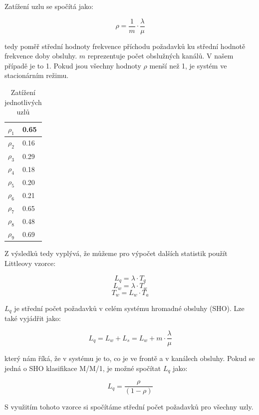 \documentclass{article}
\begin{document}
Zatížení uzlu se spočítá jako:

$$
	\rho = \frac{1}{m} \cdot \frac{\lambda}{\mu}
$$

tedy poměř střední hodnoty frekvence příchodu požadavků ku střední hodnotě frekvence doby obsluhy. $m$ reprezentuje počet obslužných kanálů. 
V našem případě je to 1.
Pokud jsou všechny hodnoty $ \rho $ menší než 1, je systém ve stacionárním režimu.

\begin{table} [ht!]
\centering
    \begin{tabular}{|l|l|}
    \hline
   $\rho_1$     & 0.65 \\ \hline
    $\rho_2$  & 0.16 \\ \hline
    $\rho_3$     & 0.29 \\ \hline
    $\rho_4$     & 0.18 \\ \hline
    $\rho_5$     & 0.20 \\ \hline
    $\rho_6$      & 0.21 \\ \hline
    $\rho_7$      & 0.65 \\ \hline
    $\rho_8$      & 0.48 \\ \hline
    $\rho_9$      & 0.69 \\ \hline
    \end{tabular}
    \caption {Zatížení jednotlivých uzlů}
\end{table}

Z výsledků tedy vyplývá, že můžeme pro výpočet dalších statistik použít Littleovy vzorce:

$$
L_q = \lambda \cdot T_q
$$
$$
L_w = \lambda \cdot T_w
$$
$$
T_w = L_w \cdot T_a
$$

$L_q$ je střední počet požadavků v celém systému hromadné obsluhy (SHO). Lze také vyjádřit jako:

$$
	L_q = L_w + L_s = L_w + m \cdot \frac{ \lambda }{ \mu }
$$

který nám říká, že v systému je to, co je ve frontě a v kanálech obsluhy.
Pokud se jedná o SHO klasifikace  M/M/1, je možné spočítat $L_q$ jako:

$$
L_q = \frac{\rho}{(1 - \rho)}
$$

S využitím tohoto vzorce si spočítáme střední počet požadavků pro všechny uzly.
\end{document}
